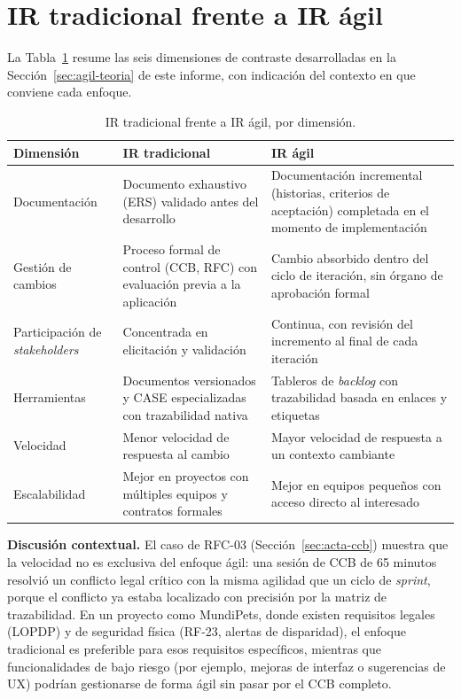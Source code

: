 \documentclass[journal,onecolumn]{IEEEtran}
\begin{document}
	\section{IR tradicional frente a IR ágil}
	\label{sec:tradicional-agil}
	
	La Tabla~\ref{tab:tradicional-agil} resume las seis dimensiones de
	contraste desarrolladas en la
	Sección~\ref{sec:agil-teoria} de este informe, con indicación del
	contexto en que conviene cada enfoque.
	
	\begin{table}[H]
		\centering
		\caption{IR tradicional frente a IR ágil, por dimensión.}
		\label{tab:tradicional-agil}
		\small
		\begin{tabularx}{\textwidth}{@{}l X X@{}}
			\toprule
			\textbf{Dimensión} & \textbf{IR tradicional} & \textbf{IR ágil} \\
			\midrule
			Documentación & Documento exhaustivo (ERS) validado antes del desarrollo & Documentación incremental (historias, criterios de aceptación) completada en el momento de implementación \\
			\addlinespace
			Gestión de cambios & Proceso formal de control (CCB, RFC) con evaluación previa a la aplicación & Cambio absorbido dentro del ciclo de iteración, sin órgano de aprobación formal \\
			\addlinespace
			Participación de \emph{stakeholders} & Concentrada en elicitación y validación & Continua, con revisión del incremento al final de cada iteración \\
			\addlinespace
			Herramientas & Documentos versionados y CASE especializadas con trazabilidad nativa & Tableros de \emph{backlog} con trazabilidad basada en enlaces y etiquetas \\
			\addlinespace
			Velocidad & Menor velocidad de respuesta al cambio & Mayor velocidad de respuesta a un contexto cambiante \\
			\addlinespace
			Escalabilidad & Mejor en proyectos con múltiples equipos y contratos formales & Mejor en equipos pequeños con acceso directo al interesado \\
			\bottomrule
		\end{tabularx}
	\end{table}
	
	\textbf{Discusión contextual.} El caso de RFC-03
	(Sección~\ref{sec:acta-ccb}) muestra que la velocidad no es
	exclusiva del enfoque ágil: una sesión de CCB de 65 minutos
	resolvió un conflicto legal crítico con la misma agilidad que un
	ciclo de \emph{sprint}, porque el conflicto ya estaba localizado
	con precisión por la matriz de trazabilidad. En un proyecto como
	MundiPets, donde existen requisitos legales (LOPDP) y de seguridad
	física (RF-23, alertas de disparidad), el enfoque tradicional es
	preferible para esos requisitos específicos, mientras que
	funcionalidades de bajo riesgo (por ejemplo, mejoras de interfaz o
	sugerencias de UX) podrían gestionarse de forma ágil sin pasar por
	el CCB completo.
	
\end{document}
